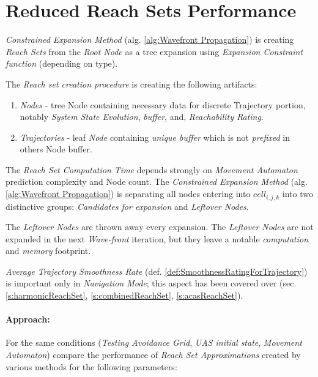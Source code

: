 \cleardoublepage
\section{Reduced Reach Sets Performance}\label{sec:reducedReachSetPerformance}

\noindent \emph{Constrained Expansion Method} (alg. \ref{alg:Wavefront Propagation}) is creating \emph{Reach Sets} from the \emph{Root Node} as a tree expansion using \emph{Expansion Constraint function} (depending on type).

The \emph{Reach set creation procedure} is creating the following artifacts:

\begin{enumerate}
    \item \emph{Nodes} - tree Node containing necessary data for discrete Trajectory portion, notably \emph{System State Evolution}, \emph{buffer}, and, \emph{Reachability Rating}.
    
    \item \emph{Trajectories} - leaf \emph{Node} containing \emph{unique buffer} which is not \emph{prefixed} in others Node buffer. 
\end{enumerate}

The \emph{Reach Set Computation Time} depends strongly on \emph{Movement Automaton} prediction complexity and Node count. The \emph{Constrained Expansion Method} (alg. \ref{alg:Wavefront Propagation}) is separating all nodes entering into $cell_{i,j,k}$ into two distinctive groups: \emph{Candidates for expansion} and \emph{Leftover Nodes}. 

The \emph{Leftover Nodes} are thrown away every expansion. The \emph{Leftover Nodes} are not expanded in the next \emph{Wave-front} iteration, but they leave a notable \emph{computation} and \emph{memory} footprint.

\begin{note}
    \emph{Average Trajectory Smoothness Rate} (def. \ref{def:SmoothnessRatingForTrajectory}) is important only in \emph{Navigation Mode}; this aspect has been covered over (sec. \ref{s:harmonicReachSet}, \ref{s:combinedReachSet}, \ref{s:acasReachSet}).
\end{note}

\paragraph{Approach:} For the same conditions (\emph{Testing Avoidance Grid}, \emph{UAS initial state}, \emph{Movement Automaton}) compare the performance of \emph{Reach Set Approximations} created by various methods for the following parameters:

